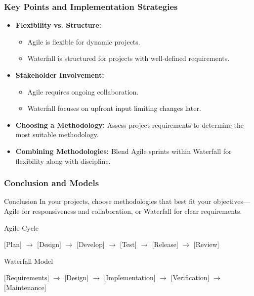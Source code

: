 \documentclass{beamer}
\begin{document}
\begin{frame}[fragile]
    \frametitle{Key Points and Implementation Strategies}
    \begin{itemize}
        \item \textbf{Flexibility vs. Structure:}
        \begin{itemize}
            \item Agile is flexible for dynamic projects.
            \item Waterfall is structured for projects with well-defined requirements.
        \end{itemize}
        \item \textbf{Stakeholder Involvement:}
        \begin{itemize}
            \item Agile requires ongoing collaboration.
            \item Waterfall focuses on upfront input limiting changes later.
        \end{itemize}
        \item \textbf{Choosing a Methodology:} Assess project requirements to determine the most suitable methodology.
        \item \textbf{Combining Methodologies:} Blend Agile sprints within Waterfall for flexibility along with discipline.
    \end{itemize}
\end{frame}

\begin{frame}[fragile]
    \frametitle{Conclusion and Models}
    \begin{block}{Conclusion}
        In your projects, choose methodologies that best fit your objectives—Agile for responsiveness and collaboration, or Waterfall for clear requirements.
    \end{block}
    \begin{block}{Agile Cycle}
        \begin{center}
        [Plan] $\rightarrow$ [Design] $\rightarrow$ [Develop] $\rightarrow$ [Test] $\rightarrow$ [Release] $\rightarrow$ [Review]
        \end{center}
    \end{block}
    \begin{block}{Waterfall Model}
        \begin{center}
        [Requirements] $\rightarrow$ [Design] $\rightarrow$ [Implementation] $\rightarrow$ [Verification] $\rightarrow$ [Maintenance]
        \end{center}
    \end{block}
\end{frame}
\end{document}
